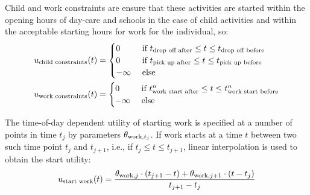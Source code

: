 Child and work constraints are ensure that these activities are started within the opening hours of day-care and schools in the case of child activities and within the acceptable starting hours for work for the individual, so:
\begin{equation*}
\begin{aligned}
		u_\text{child constraints}(t) &= 
		\begin{cases}
				0 & \cif t_{\text{drop off after}} \leq t \leq t_{\text{drop off before}} \\
		0 & \cif t_{\text{pick up after}} \leq t \leq t_{\text{pick up before}} \\
		-\infty & \celse
		\end{cases} 
		\\
		u_\text{work constraints}(t) &= 
		\begin{cases}
		0 & \cif t_{\text{work start after}}^n \leq t \leq t_{\text{work start before}}^n \\
		-\infty & \celse
		\end{cases}
\end{aligned}
\end{equation*}

The time-of-day dependent utility of starting work is specified at a number of points in time $t_j$ by parameters $\theta_{\text{work},t_j}$. If work starts at a time $t$ between two such time point $t_j$ and $t_{j+1}$, i.e., if $t_j\leq t \leq t_{j+1}$, linear interpolation is used to obtain the start utility:
\begin{equation*}
u_{\text{start work}}(t)  = \frac{\acp_{\text{work},j}\cdot (t_{j+1}-t)+\acp_{\text{work},j+1}\cdot (t-t_j)}{t_{j+1}-t_{j}}
\end{equation*}
